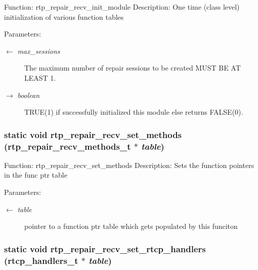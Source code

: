Function: rtp\_\-repair\_\-recv\_\-init\_\-module Description: One time (class level) initialization of various function tables \begin{Desc}
\item[Parameters:]
\begin{description}
\item[\mbox{$\leftarrow$} {\em max\_\-sessions}]The maximum number of repair sessions to be created MUST BE AT LEAST 1. \item[\mbox{$\rightarrow$} {\em boolean}]TRUE(1) if successfully initialized this module else returns FALSE(0). \end{description}
\end{Desc}
\subsubsection{\setlength{\rightskip}{0pt plus 5cm}static void rtp\_\-repair\_\-recv\_\-set\_\-methods (\bf{rtp\_\-repair\_\-recv\_\-methods\_\-t} $\ast$ {\em table})\hspace{0.3cm}{\tt  [static]}}\label{rtp__repair__recv_8c_48923ca07af93b33fd0bd9bed416f5b6}


Function: rtp\_\-repair\_\-recv\_\-set\_\-methods Description: Sets the function pointers in the func ptr table \begin{Desc}
\item[Parameters:]
\begin{description}
\item[\mbox{$\leftarrow$} {\em table}]pointer to a function ptr table which gets populated by this funciton \end{description}
\end{Desc}
\subsubsection{\setlength{\rightskip}{0pt plus 5cm}static void rtp\_\-repair\_\-recv\_\-set\_\-rtcp\_\-handlers (rtcp\_\-handlers\_\-t $\ast$ {\em table})\hspace{0.3cm}{\tt  [static]}}\label{rtp__repair__recv_8c_c03e72c0f59a04cc8eb21f5e21e3cd1e}


